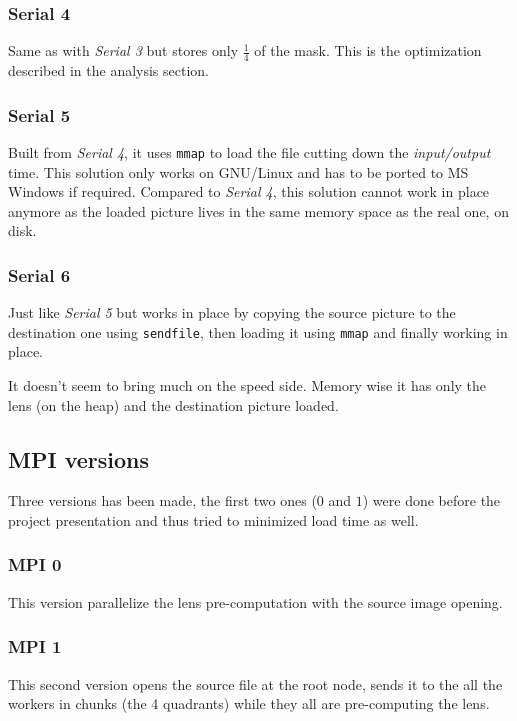 \documentclass[10pt,a4paper]{article}
\begin{document}
\subsubsection{Serial 4}

Same as with \emph{Serial 3} but stores only $\frac{1}{4}$ of the mask. This is
the optimization described in the analysis section.

\subsubsection{Serial 5}

Built from \emph{Serial 4}, it uses \verb|mmap| to load the file cutting down
the \emph{input/output} time. This solution only works on GNU/Linux and has to
be ported to MS Windows if required. Compared to \emph{Serial 4}, this solution
cannot work in place anymore as the loaded picture lives in the same memory
space as the real one, on disk.

\subsubsection{Serial 6}

Just like \emph{Serial 5} but works in place by copying the source picture to
the destination one using \verb|sendfile|, then loading it using \verb|mmap|
and finally working in place.

It doesn't seem to bring much on the speed side. Memory wise it has only the
lens (on the heap) and the destination picture loaded.

\subsection{MPI versions}
Three versions has been made, the first two ones ($0$ and $1$) were done before
the project presentation and thus tried to minimized load time as well.

\subsubsection{MPI 0}

This version parallelize the lens pre-computation with the source image opening.

\subsubsection{MPI 1}

This second version opens the source file at the root node, sends it to the all
the workers in chunks (the 4 quadrants) while they all are pre-computing the
lens.
\end{document}
